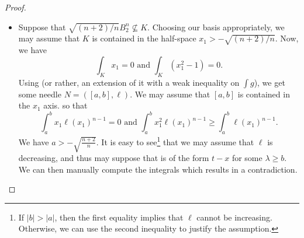 \begin{proof}
	\phantom{agh}
	\begin{itemize}
		\item Suppose that $\sqrt{(n+2)/n}B_2^n\not\subseteq K$. Choosing our basis appropriately, we may assume that $K$ is contained in the half-space $x_1 > -\sqrt{(n+2)/n}$. Now, we have
		\[ \int_K x_1 = 0 \text{ and } \int_K (x_1^2 - 1) = 0. \]
		Using  (or rather, an extension of it with a weak inequality on $\int g$), we get some needle $N=([a,b],\ell)$. We may assume that $[a,b]$ is contained in the $x_1$ axis. so that
		\[ \int_a^b x_1\ell(x_1)^{n-1} = 0 \text{ and } \int_a^b x_1^2\ell(x_1)^{n-1} \geq \int_a^b \ell(x_1)^{n-1}. \]
		We have $a > -\sqrt{\frac{n+2}{n}}$. It is easy to see\footnote{If $|b|>|a|$, then the first equality implies that $\ell$ cannot be increasing. Otherwise, we can use the second inequality to justify the assumption.} that we may assume that $\ell$ is decreasing, and thus may suppose that is of the form $t-x$ for some $\lambda\geq b$. We can then manually compute the integrals which results in a contradiction.


\end{itemize}
\end{proof}
